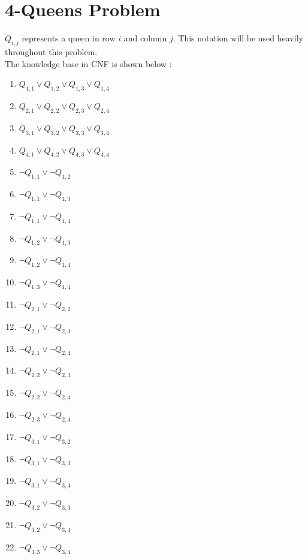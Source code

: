 \documentclass[22pt]{article}
\begin{document}
\newpage

\section{4-Queens Problem}

$Q_{i,j}$ represents a queen in row $i$ and column $j$. This notation will be 
used heavily throughout this problem. \\

The knowledge base in CNF is shown below :

\begin{multicols}{4}
\begin{enumerate}
	\item $Q_{1,1} \lor Q_{1,2} \lor Q_{1,3} \lor Q_{1,4}$
	\item $Q_{2,1} \lor Q_{2,2} \lor Q_{2,3} \lor Q_{2,4}$
	\item $Q_{3,1} \lor Q_{3,2} \lor Q_{3,3} \lor Q_{3,4}$
	\item $Q_{4,1} \lor Q_{4,2} \lor Q_{4,3} \lor Q_{4,4}$

	\item $\neg Q_{1,1} \lor \neg Q_{1,2}$
	\item $\neg Q_{1,1} \lor \neg Q_{1,3}$
	\item $\neg Q_{1,1} \lor \neg Q_{1,4}$
	\item $\neg Q_{1,2} \lor \neg Q_{1,3}$
	\item $\neg Q_{1,2} \lor \neg Q_{1,4}$
	\item $\neg Q_{1,3} \lor \neg Q_{1,4}$

	\item $\neg Q_{2,1} \lor \neg Q_{2,2}$
	\item $\neg Q_{2,1} \lor \neg Q_{2,3}$
	\item $\neg Q_{2,1} \lor \neg Q_{2,4}$
	\item $\neg Q_{2,2} \lor \neg Q_{2,3}$
	\item $\neg Q_{2,2} \lor \neg Q_{2,4}$
	\item $\neg Q_{2,3} \lor \neg Q_{2,4}$

	\item $\neg Q_{3,1} \lor \neg Q_{3,2}$
	\item $\neg Q_{3,1} \lor \neg Q_{3,3}$
	\item $\neg Q_{3,1} \lor \neg Q_{3,4}$
	\item $\neg Q_{3,2} \lor \neg Q_{3,3}$
	\item $\neg Q_{3,2} \lor \neg Q_{3,4}$
	\item $\neg Q_{3,3} \lor \neg Q_{3,4}$


\end{enumerate}
\end{multicols}
\end{document}
